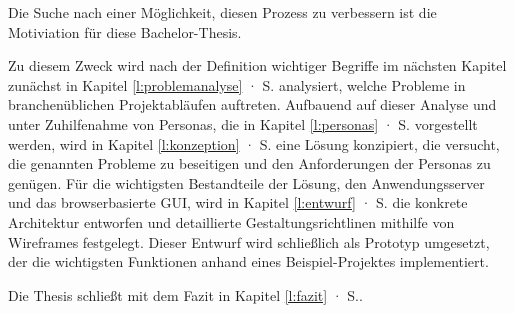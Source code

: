 \bigskip

Die Suche nach einer Möglichkeit, diesen Prozess zu verbessern ist die Motiviation für diese Bachelor-Thesis. 

\bigskip

Zu diesem Zweck wird nach der Definition wichtiger Begriffe im nächsten Kapitel zunächst in Kapitel \ref{l:problemanalyse} · S.\pageref{l:problemanalyse} analysiert, welche Probleme in branchenüblichen Projektabläufen auftreten. Aufbauend auf dieser Analyse und unter Zuhilfenahme von Personas, die in Kapitel \ref{l:personas} · S.\pageref{l:personas} vorgestellt werden, wird in Kapitel \ref{l:konzeption} · S.\pageref{l:konzeption} eine Lösung konzipiert, die versucht, die genannten Probleme zu beseitigen und den Anforderungen der Personas zu genügen. Für die wichtigsten Bestandteile der Lösung, den Anwendungsserver und das browserbasierte GUI, wird in Kapitel \ref{l:entwurf} · S.\pageref{l:entwurf} die konkrete Architektur entworfen und detaillierte Gestaltungsrichtlinen mithilfe von Wireframes festgelegt. Dieser Entwurf wird schließlich als Prototyp umgesetzt, der die wichtigsten Funktionen anhand eines Beispiel-Projektes implementiert.

Die Thesis schließt mit dem Fazit in Kapitel \ref{l:fazit} · S.\pageref{l:fazit}.

\pagebreak